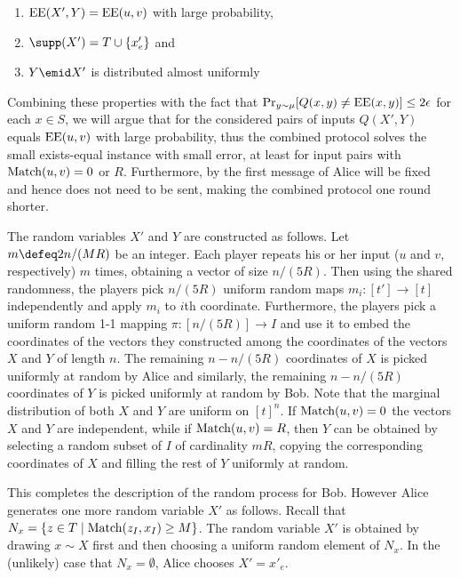 \begin{enumerate}[(P1)]
\item $\operatorname{EE}(X',Y)=\operatorname{EE}(u,v)$ with large probability,
\label{prop:2}
\item $\supp(X')=T\cup \{x'_e\}$ and
\label{prop:3}
\item $Y\emid X'$ is distributed almost uniformly
\label{prop:4}
\end{enumerate}

Combining these properties with the fact that $\Pr_{y\sim
\mu}[Q(x,y)\neq\operatorname{EE}(x,y)]\leq 2\epsilon$ for each $x\in S$, we
will argue that for the considered pairs of inputs $Q(X',Y)$
equals $\operatorname{EE}(u,v)$ with large probability, thus the combined
protocol solves the small exists-equal instance with small
error, at least for input pairs with $\operatorname{Match}(u,v)=0$ or $R$.
Furthermore, by  the first message of Alice will
be fixed and hence does not need to be sent, making the combined
protocol one round shorter.

The random variables $X'$ and $Y$ are constructed as follows.
Let $m\defeq 2n/(MR)$ be an integer. Each player repeats his or
her input ($u$ and $v$, respectively) $m$ times, obtaining a
vector of size $n/(5R)$. Then using the shared randomness, the
players pick $n/(5R)$ uniform random maps $m_i:[t']\to[t]$
independently and apply $m_i$ to $i$\/th coordinate.
Furthermore, the players pick a uniform random 1-1 mapping
$\pi:[n/(5R)]\to I$ and use it to embed the coordinates of the
vectors they constructed among the coordinates of the vectors
$X$ and $Y$ of length $n$. The remaining $n-n/(5R)$ coordinates
of $X$ is picked uniformly at random by Alice and similarly, the
remaining $n-n/(5R)$ coordinates of $Y$ is picked uniformly at
random by Bob. Note that the marginal distribution of both $X$
and $Y$ are uniform on $[t]^n$. If $\operatorname{Match}(u,v)=0$ the vectors
$X$ and $Y$ are independent, while if $\operatorname{Match}(u,v)=R$, then $Y$
can be obtained by selecting a random subset of $I$ of
cardinality $mR$, copying the corresponding coordinates of $X$
and filling the rest of $Y$ uniformly at random.

This completes the description of the random process for Bob.
However Alice generates one more random variable $X'$ as
follows. Recall that $N_x=\{z\in T\mid\operatorname{Match}(z_I,x_I)\ge M\}$.
The random variable $X'$ is obtained by drawing $x\sim X$ first
and then choosing a uniform random element of $N_x$. In the
(unlikely) case that $N_x=\emptyset$, Alice chooses $X'=x'_e$.

